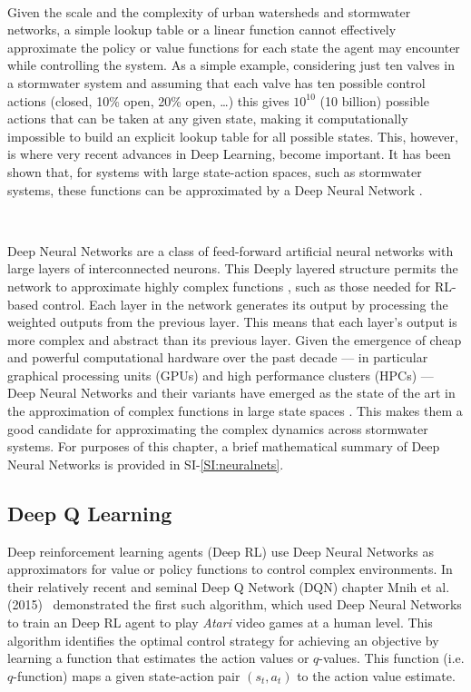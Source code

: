 \

Given the scale and the complexity of urban watersheds and stormwater networks, a simple lookup table or a linear  function cannot effectively approximate the policy or value functions for each state the agent may encounter while controlling the system.
As a simple example, considering just ten valves in a stormwater system and assuming that each valve has ten possible control actions (closed, 10\% open, 20\% open, \ldots) this gives $10^{10}$ (10 billion) possible actions that can be taken at any given state, making it computationally impossible to build an explicit lookup table for all possible states.
This, however, is where very recent advances in Deep Learning, become important.
It has been shown that, for systems with large state-action spaces, such as stormwater systems, these functions can be approximated by a Deep Neural Network  \cite{Sutton98,Mnih2015}.

\

Deep Neural Networks are a class of feed-forward artificial neural networks with large layers of interconnected neurons.
This Deeply layered structure permits the network to approximate highly complex functions \cite{hornik1989multilayer}, such as those needed for RL-based control.
Each layer in the network generates its output by processing the weighted outputs from the previous layer.
This means that each layer's output is more complex and abstract than its previous layer.
Given the emergence of cheap and powerful computational hardware over the past decade --- in particular graphical processing units (GPUs) and high performance clusters (HPCs) --- Deep Neural Networks and their variants have emerged as the state of the art in the approximation of complex functions in large state spaces \cite{LeCun2015DeepLearning}.
This makes them a good candidate for approximating the complex dynamics across stormwater systems. For purposes of this chapter, a brief mathematical summary of Deep Neural Networks is provided in SI-\ref{SI:neuralnets}.

\subsection{Deep Q Learning}

Deep reinforcement learning agents (Deep RL) use Deep Neural Networks as approximators for value or policy functions to control complex environments.
In their relatively recent and seminal Deep Q Network (DQN) chapter Mnih et al. (2015)~\cite{Mnih2015} demonstrated the first such algorithm, which used Deep Neural Networks to train an Deep RL agent to play \textit{Atari} video games at a human level.
This algorithm identifies the optimal control strategy for achieving an objective by learning a function that estimates the action values or $q$-values.
This function (i.e. $q$-function) maps a given state-action pair $(s_t,a_t)$ to the action value estimate.


